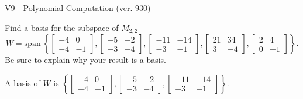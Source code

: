 \begin{exercise}
  \begin{exerciseTitle}V9 - Polynomial Computation (ver. 930)\end{exerciseTitle}
  \begin{exerciseStatement}
    Find a basis for the subspace of \(M_{2,2}\) 
\[W=\mathrm{span}\ \left\{\left[\begin{array}{cc}
-4 & 0 \\
-4 & -1
\end{array}\right] , \left[\begin{array}{cc}
-5 & -2 \\
-3 & -4
\end{array}\right] , \left[\begin{array}{cc}
-11 & -14 \\
-3 & -1
\end{array}\right] , \left[\begin{array}{cc}
21 & 34 \\
3 & -4
\end{array}\right] , \left[\begin{array}{cc}
2 & 4 \\
0 & -1
\end{array}\right]\right\}.\]
 Be sure to explain why your result is a basis.


  \end{exerciseStatement}
  \begin{exerciseAnswer}
   A basis of \(W\) is  \(\left\{\left[\begin{array}{cc}
-4 & 0 \\
-4 & -1
\end{array}\right] , \left[\begin{array}{cc}
-5 & -2 \\
-3 & -4
\end{array}\right] , \left[\begin{array}{cc}
-11 & -14 \\
-3 & -1
\end{array}\right]\right\}\).
  


  \end{exerciseAnswer}
\end{exercise}